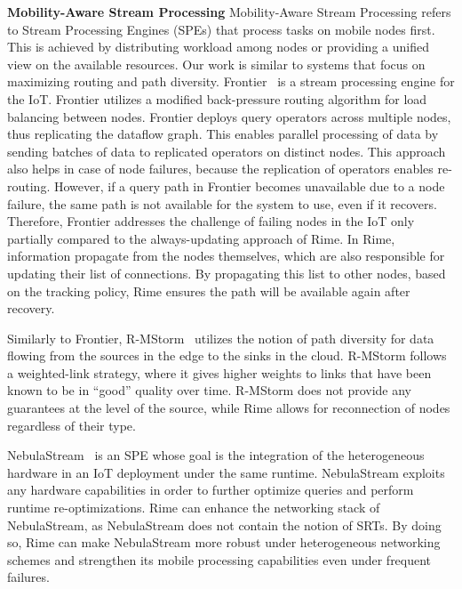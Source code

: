\textbf{Mobility-Aware Stream Processing} Mobility-Aware Stream Processing refers to Stream Processing Engines (SPEs) that process tasks on mobile nodes first. This is achieved by distributing workload among nodes or providing a unified
view on the available resources. Our work is similar to systems that focus on maximizing routing and path diversity.
Frontier~\cite{okeeffe2018frontier} is a stream processing engine for the IoT. Frontier utilizes a modified back-pressure routing algorithm for load balancing between nodes. Frontier deploys query operators across multiple nodes, thus replicating the dataflow graph. This enables parallel processing of data by sending batches of data to replicated operators on distinct nodes. This approach also helps in case of node failures, because the replication of operators enables re-routing. However, if a query path in Frontier becomes unavailable due to a node failure, the same path is not available for the system to use, even if it recovers. Therefore, Frontier addresses the challenge of failing nodes in the IoT only partially compared to the always-updating approach of Rime. In Rime, information propagate from the nodes themselves, which are also responsible for updating their list of connections. By propagating this list to other nodes, based on the tracking policy, Rime ensures the path will be available again after recovery.

Similarly to Frontier, R-MStorm~\cite{chao2020r} utilizes the notion of path diversity for data flowing from the sources in the edge to the sinks in the cloud. R-MStorm follows a weighted-link strategy, where it gives higher weights to links that have been known to be in ``good'' quality over time. R-MStorm does not provide any guarantees at the level of the source, while Rime allows for reconnection of nodes regardless of their type.

NebulaStream~\cite{zeuch2020nebulastream, zeuch2020vloitnebulastream} is an SPE whose goal is the integration of the heterogeneous hardware in an IoT deployment under the same runtime. NebulaStream exploits any hardware capabilities in order to further optimize queries and perform runtime re-optimizations. Rime can enhance the networking stack of NebulaStream, as NebulaStream does not contain the notion of SRTs. By doing so, Rime can make NebulaStream more robust under heterogeneous networking schemes and strengthen its mobile processing capabilities even under frequent failures.


